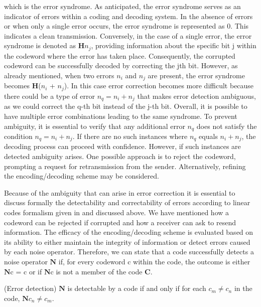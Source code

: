 \documentclass{Configuration_Files/PoliMi3i_thesis}
\begin{document}
which is the error syndrome. As anticipated, the error syndrome serves as an indicator of errors within a coding and decoding system. In the absence of errors or when only a single error occurs, the error syndrome is represented as 0. This indicates a clean transmission. Conversely, in the case of a single error, the error syndrome is denoted as {\bf H}$n_j$, providing information about the specific bit j within the codeword where the error has taken place. Consequently, the corrupted codeword can be successfully decoded by correcting the jth bit. However, as already mentioned, when two errors $n_i$ and $n_j$ are present, the error syndrome becomes {\bf H}($n_i$ + $n_j$). In this case error correction becomes more difficult because there could be a type of error $n_q = n_i + n_j$ that makes error detection ambiguous, as we could correct the q-th bit instead of the j-th bit. Overall, it is possible to have multiple error combinations leading to the same syndrome. To prevent ambiguity, it is essential to verify that any additional error $n_q$ does not satisfy the condition $n_q = n_i + n_j$. If there are no such instances where $n_q$ equals $ n_i + n_j$, the decoding process can proceed with confidence. However, if such instances are detected ambiguity arises. One possible approach is to reject the codeword, prompting a request for retransmission from the sender. Alternatively, refining the encoding/decoding scheme may be considered. \newline

Because of the ambiguity that can arise in error correction it is essential to discuss formally the detectability and correctability of errors according to linear codes formalism given in \cite{Cha06} and discussed above.
We have mentioned how a codeword can be rejected if corrupted and how a receiver can ask to resend information. The efficacy of the encoding/decoding scheme is evaluated based on its ability to either maintain the integrity of information or detect errors caused by each noise operator. Therefore, we can state that a code successfully detects a noise operator $\textbf{N}$ if, for every codeword c within the code, the outcome is either $\textbf{N}$c = c or if $\textbf{N}$c is not a member of the code $\textbf{C}$.

\begin{theorem}(Error detection)
	$\textbf{N}$ is detectable by a code if and only if for each $c_m \neq c_n$ in the code, $\textbf{N}c_n \neq c_m $.
\end{theorem} 
\end{document}
